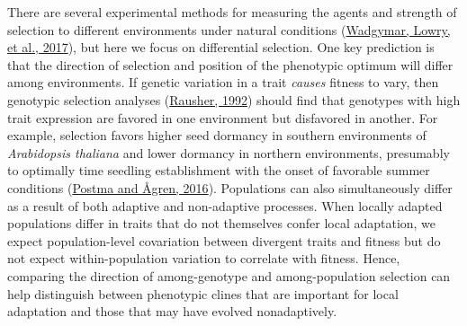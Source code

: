 \documentclass[
  12pt,
]{article}
\begin{document}
There are several experimental methods for measuring the agents and strength of selection to different environments under natural conditions (\protect\hyperlink{ref-wadgymar_identifying_2017}{Wadgymar, Lowry, et al., 2017}), but here we focus on differential selection. One key prediction is that the direction of selection and position of the phenotypic optimum will differ among environments. If genetic variation in a trait \emph{causes} fitness to vary, then genotypic selection analyses (\protect\hyperlink{ref-rausher_measurement_1992}{Rausher, 1992}) should find that genotypes with high trait expression are favored in one environment but disfavored in another. For example, selection favors higher seed dormancy in southern environments of \emph{Arabidopsis thaliana} and lower dormancy in northern environments, presumably to optimally time seedling establishment with the onset of favorable summer conditions (\protect\hyperlink{ref-postma_early_2016}{Postma and Ågren, 2016}). Populations can also simultaneously differ as a result of both adaptive and non-adaptive processes. When locally adapted populations differ in traits that do not themselves confer local adaptation, we expect population-level covariation between divergent traits and fitness but do not expect within-population variation to correlate with fitness. Hence, comparing the direction of among-genotype and among-population selection can help distinguish between phenotypic clines that are important for local adaptation and those that may have evolved nonadaptively.
\end{document}
